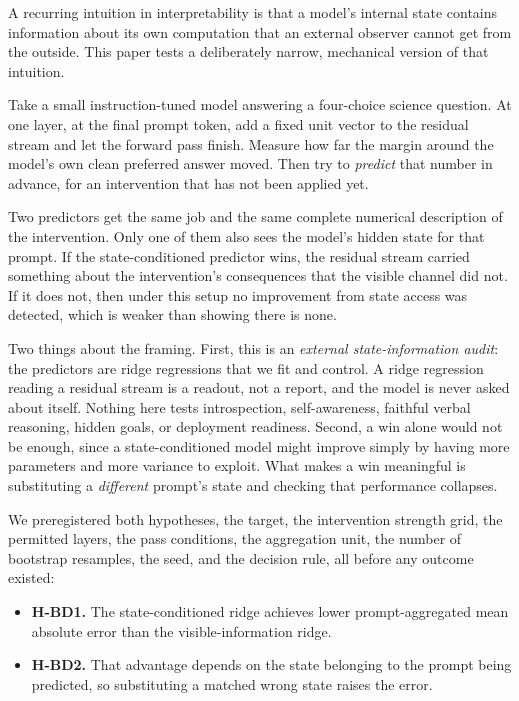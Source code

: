 \documentclass{article}
\begin{document}
A recurring intuition in interpretability is that a model's internal state contains information
about its own computation that an external observer cannot get from the outside. This paper tests a
deliberately narrow, mechanical version of that intuition.

Take a small instruction-tuned model answering a four-choice science question. At one layer, at the
final prompt token, add a fixed unit vector to the residual stream and let the forward pass finish.
Measure how far the margin around the model's own clean preferred answer moved. Then try to
\emph{predict} that number in advance, for an intervention that has not been applied yet.

Two predictors get the same job and the same complete numerical description of the intervention.
Only one of them also sees the model's hidden state for that prompt. If the state-conditioned
predictor wins, the residual stream carried something about the intervention's consequences that
the visible channel did not. If it does not, then under this setup no improvement from state access
was detected, which is weaker than showing there is none.

Two things about the framing. First, this is an \emph{external state-information audit}: the
predictors are ridge regressions that we fit and control. A ridge regression reading a residual
stream is a readout, not a report, and the model is never asked about itself. Nothing here tests
introspection, self-awareness, faithful verbal reasoning, hidden goals, or deployment readiness.
Second, a win alone would not be enough, since a state-conditioned model might improve simply by
having more parameters and more variance to exploit. What makes a win meaningful is substituting a
\emph{different} prompt's state and checking that performance collapses.

We preregistered both hypotheses, the target, the intervention strength grid, the permitted layers,
the pass conditions, the aggregation unit, the number of bootstrap resamples, the seed, and the
decision rule, all before any outcome existed:

\begin{itemize}
  \item \textbf{H-BD1.} The state-conditioned ridge achieves lower prompt-aggregated mean absolute
        error than the visible-information ridge.
  \item \textbf{H-BD2.} That advantage depends on the state belonging to the prompt being
        predicted, so substituting a matched wrong state raises the error.
\end{itemize}
\end{document}
